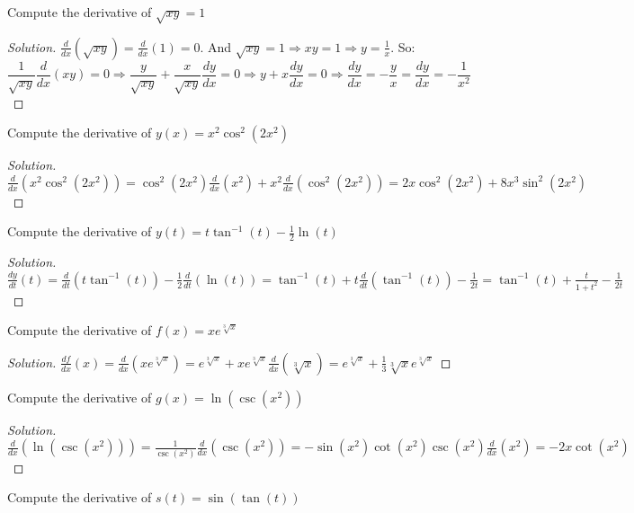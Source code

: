 \documentclass[crop=false,class=book]{standalone}
\begin{document}
\begin{problem}
Compute the derivative of $\sqrt{xy}=1$
\end{problem}
\begin{proof}[Solution]
$\frac{d}{dx}(\sqrt{xy})=\frac{d}{dx}(1)=0$. And $\sqrt{xy}=1\Rightarrow xy=1\Rightarrow y=\frac{1}{x}$. So:
\begin{equation*}
    \frac{1}{\sqrt{xy}}\frac{d}{dx}(xy)=0\Rightarrow \frac{y}{\sqrt{xy}}+\frac{x}{\sqrt{xy}}\frac{dy}{dx}=0\Rightarrow y+x\frac{dy}{dx}=0\Rightarrow\frac{dy}{dx}=-\frac{y}{x}=\frac{dy}{dx}=-\frac{1}{x^{2}}
\end{equation*}
\end{proof}
\begin{problem}
Compute the derivative of $y(x)=x^{2}\cos^{2}(2x^{2})$
\end{problem}
\begin{proof}[Solution]
$\frac{d}{dx}(x^{2}\cos^{2}(2x^{2}))=\cos^{2}(2x^{2})\frac{d}{dx}(x^{2})+x^{2}\frac{d}{dx}(\cos^{2}(2x^{2}))=2x\cos^{2}(2x^{2})+8x^{3}\sin^{2}(2x^{2})$
\end{proof}
\begin{problem}
Compute the derivative of $y(t)=t\tan^{-1}(t)-\frac{1}{2}\ln(t)$
\end{problem}
\begin{proof}[Solution]
$\frac{dy}{dt}(t)=\frac{d}{dt}(t\tan^{-1}(t))-\frac{1}{2}\frac{d}{dt}(\ln(t))=\tan^{-1}(t)+t\frac{d}{dt}(\tan^{-1}(t))-\frac{1}{2t}=\tan^{-1}(t)+\frac{t}{1+t^{2}}-\frac{1}{2t}$
\end{proof}
\begin{problem}
Compute the derivative of $f(x)=xe^{\sqrt[3]{x}}$
\end{problem}
\begin{proof}[Solution]
$\frac{df}{dx}(x)=\frac{d}{dx}(xe^{\sqrt[3]{x}})=e^{\sqrt[3]{x}}+xe^{\sqrt[3]{x}}\frac{d}{dx}(\sqrt[3]{x})=e^{\sqrt[3]{x}}+\frac{1}{3}\sqrt[3]{x}e^{\sqrt[3]{x}}$
\end{proof}
\begin{problem}
Compute the derivative of $g(x)=\ln(\csc(x^{2}))$
\end{problem}
\begin{proof}[Solution]
$\frac{d}{dx}(\ln(\csc(x^{2})))=\frac{1}{\csc(x^{2})}\frac{d}{dx}(\csc(x^{2}))=-\sin(x^{2})\cot(x^{2})\csc(x^{2})\frac{d}{dx}(x^{2})=-2x\cot(x^{2})$
\end{proof}
\begin{problem}
Compute the derivative of $s(t)=\sin(\tan(t))$
\end{problem}
\end{document}

